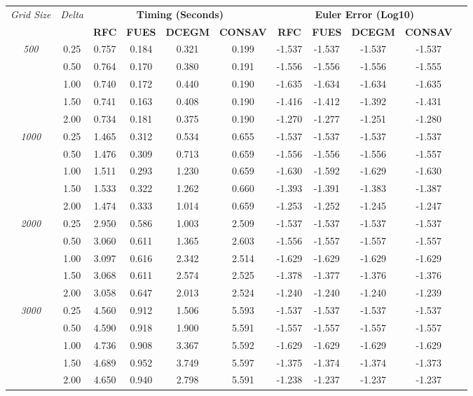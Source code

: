 
        \begin{table}[htbp]
        \centering
        \small
        \begin{tabular}{ccccccc|cccc}
        \toprule
        \multirow{2}{*}{\textit{Grid Size}} & 
        \multirow{2}{*}{\textit{Delta}} & 
        \multicolumn{4}{c}{\textbf{Timing (Seconds)}} & 
        \multicolumn{4}{c}{\textbf{Euler Error (Log10)}} \\
        & & \textbf{RFC} & \textbf{FUES} & \textbf{DCEGM} & \textbf{CONSAV} & 
        \textbf{RFC} & \textbf{FUES} & \textbf{DCEGM} & \textbf{CONSAV} \\
        \midrule
        \multirow{5}{*}{\textit{500}} & 0.25 & 0.757 & 0.184 & 0.321 & 0.199 & -1.537 & -1.537 & -1.537 & -1.537 \\
 & 0.50 & 0.764 & 0.170 & 0.380 & 0.191 & -1.556 & -1.556 & -1.556 & -1.555 \\
 & 1.00 & 0.740 & 0.172 & 0.440 & 0.190 & -1.635 & -1.634 & -1.634 & -1.635 \\
 & 1.50 & 0.741 & 0.163 & 0.408 & 0.190 & -1.416 & -1.412 & -1.392 & -1.431 \\
 & 2.00 & 0.734 & 0.181 & 0.375 & 0.190 & -1.270 & -1.277 & -1.251 & -1.280 \\
\midrule
\multirow{5}{*}{\textit{1000}} & 0.25 & 1.465 & 0.312 & 0.534 & 0.655 & -1.537 & -1.537 & -1.537 & -1.537 \\
 & 0.50 & 1.476 & 0.309 & 0.713 & 0.659 & -1.556 & -1.556 & -1.556 & -1.557 \\
 & 1.00 & 1.511 & 0.293 & 1.230 & 0.659 & -1.630 & -1.592 & -1.629 & -1.630 \\
 & 1.50 & 1.533 & 0.322 & 1.262 & 0.660 & -1.393 & -1.391 & -1.383 & -1.387 \\
 & 2.00 & 1.474 & 0.333 & 1.014 & 0.659 & -1.253 & -1.252 & -1.245 & -1.247 \\
\midrule
\multirow{5}{*}{\textit{2000}} & 0.25 & 2.950 & 0.586 & 1.003 & 2.509 & -1.537 & -1.537 & -1.537 & -1.537 \\
 & 0.50 & 3.060 & 0.611 & 1.365 & 2.603 & -1.556 & -1.557 & -1.557 & -1.557 \\
 & 1.00 & 3.097 & 0.616 & 2.342 & 2.514 & -1.629 & -1.629 & -1.629 & -1.629 \\
 & 1.50 & 3.068 & 0.611 & 2.574 & 2.525 & -1.378 & -1.377 & -1.376 & -1.376 \\
 & 2.00 & 3.058 & 0.647 & 2.013 & 2.524 & -1.240 & -1.240 & -1.240 & -1.239 \\
\midrule
\multirow{5}{*}{\textit{3000}} & 0.25 & 4.560 & 0.912 & 1.506 & 5.593 & -1.537 & -1.537 & -1.537 & -1.537 \\
 & 0.50 & 4.590 & 0.918 & 1.900 & 5.591 & -1.557 & -1.557 & -1.557 & -1.557 \\
 & 1.00 & 4.736 & 0.908 & 3.367 & 5.592 & -1.629 & -1.629 & -1.629 & -1.629 \\
 & 1.50 & 4.689 & 0.952 & 3.749 & 5.597 & -1.375 & -1.374 & -1.374 & -1.373 \\
 & 2.00 & 4.650 & 0.940 & 2.798 & 5.591 & -1.238 & -1.237 & -1.237 & -1.237 \\
\midrule


\end{tabular}
\end{table}
